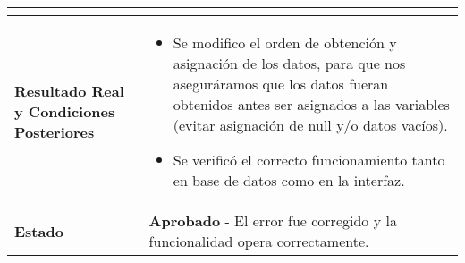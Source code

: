 \begin{longtable}{|p{5cm}|p{10cm}|}
\begin{itemize}
	\end{itemize} \\
	\hline
	\textbf{Resultado Real y Condiciones Posteriores} & 
	\begin{itemize}
		\item Se modifico el orden de obtención y asignación de los datos, para que nos aseguráramos que los datos fueran  obtenidos antes ser asignados a las variables (evitar asignación de null y/o datos vacíos).
		\item Se verificó el correcto funcionamiento tanto en base de datos como en la interfaz.
	\end{itemize} \\
	\hline
	\textbf{Estado} & 
	\textbf{Aprobado} - El error fue corregido y la funcionalidad opera correctamente. \\
	\hline
\end{longtable}